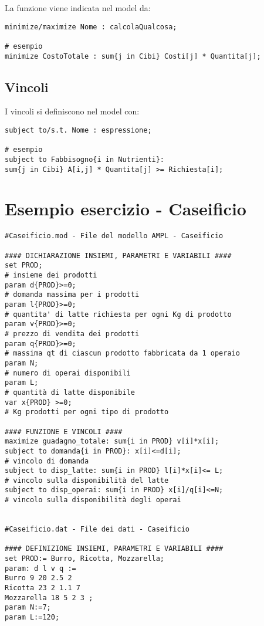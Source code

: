 La funzione viene indicata nel model da:
\begin{verbatim}
minimize/maximize Nome : calcolaQualcosa;

# esempio
minimize CostoTotale : sum{j in Cibi} Costi[j] * Quantita[j];
\end{verbatim}


\subsection{Vincoli}
I vincoli si definiscono nel model con:
\begin{verbatim}
subject to/s.t. Nome : espressione;

# esempio
subject to Fabbisogno{i in Nutrienti}:
sum{j in Cibi} A[i,j] * Quantita[j] >= Richiesta[i];
\end{verbatim}

\newpage
\section{Esempio esercizio - Caseificio}
\begin{framed}
\begin{verbatim}
#Caseificio.mod - File del modello AMPL - Caseificio

#### DICHIARAZIONE INSIEMI, PARAMETRI E VARIABILI ####
set PROD;
# insieme dei prodotti
param d{PROD}>=0;
# domanda massima per i prodotti
param l{PROD}>=0;
# quantita' di latte richiesta per ogni Kg di prodotto
param v{PROD}>=0;
# prezzo di vendita dei prodotti
param q{PROD}>=0;
# massima qt di ciascun prodotto fabbricata da 1 operaio
param N;
# numero di operai disponibili
param L;
# quantità di latte disponibile
var x{PROD} >=0;
# Kg prodotti per ogni tipo di prodotto

#### FUNZIONE E VINCOLI ####
maximize guadagno_totale: sum{i in PROD} v[i]*x[i];
subject to domanda{i in PROD}: x[i]<=d[i];
# vincolo di domanda
subject to disp_latte: sum{i in PROD} l[i]*x[i]<= L;
# vincolo sulla disponibilità del latte
subject to disp_operai: sum{i in PROD} x[i]/q[i]<=N;
# vincolo sulla disponibilità degli operai


#Caseificio.dat - File dei dati - Caseificio

#### DEFINIZIONE INSIEMI, PARAMETRI E VARIABILI ####
set PROD:= Burro, Ricotta, Mozzarella;
param: d l v q :=
Burro 9 20 2.5 2
Ricotta 23 2 1.1 7
Mozzarella 18 5 2 3 ;
param N:=7;
param L:=120;
\end{verbatim}
\end{framed}




